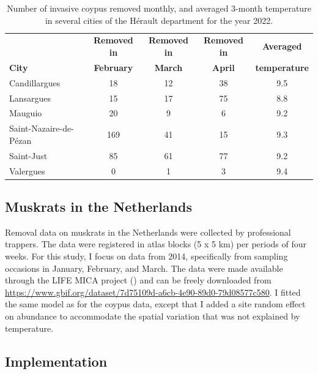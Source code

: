 \documentclass[
  11pt,
  a4paper,
]{article}
\begin{document}
\begin{table}[ht]
\centering
\begin{tabular}{lcccc}
\hline
\textbf{} & \textbf{Removed in} & \textbf{Removed in} & \textbf{Removed in} & \textbf{Averaged} \\
\textbf{City} & \textbf{February} & \textbf{March} & \textbf{April} & \textbf{temperature}\\
\hline
Candillargues & 18  & 12    & 38 & 9.5 \\
Lansargues    & 15  & 17    & 75 & 8.8 \\
Mauguio       & 20  & 9 & 6 & 9.2 \\
Saint-Nazaire-de-Pézan & 169    & 41    & 15 & 9.3 \\
Saint-Just    & 85  & 61    & 77 & 9.2 \\
Valergues     & 0 & 1   & 3 & 9.4 \\
\hline
\end{tabular}
\caption{Number of invasive coypus removed monthly, and averaged 3-month temperature in several cities of the Hérault department for the year 2022.}
\label{tab:coypus}
\end{table}

\subsection{Muskrats in the Netherlands}\label{muskrats-in-the-netherlands}

Removal data on muskrats in the Netherlands were collected by professional trappers. The data were registered in atlas blocks (5 x 5 km) per periods of four weeks. For this study, I focus on data from 2014, specifically from sampling occasions in January, February, and March. The data were made available through the LIFE MICA project () and can be freely downloaded from \url{https://www.gbif.org/dataset/7d75109d-a6cb-4e90-89d0-79d08577c580}. I fitted the same model as for the coypus data, except that I added a site random effect on abundance to accommodate the spatial variation that was not explained by temperature.

\subsection{Implementation}\label{implementation}
\end{document}
